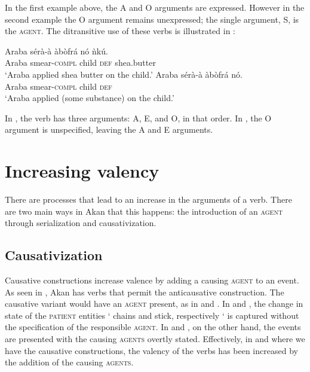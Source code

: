 \documentclass[output=paper]{langsci/langscibook}
\begin{document}
In the first example above, the A and O arguments are expressed. However in the second example the O argument remains unexpressed; the single argument, S, is the \textsc{agent}. The ditransitive use of these verbs is illustrated in :

\ea\label{ex:41.osam}
\ea\label{ex:41a.osam}
\gll  Araba  sérà-à    àbòfrá  nó  ǹkú.\\
       Araba  smear-\textsc{compl}  child  \textsc{def}  shea.butter\\
\glt `Araba applied shea butter on the child.'
\ex\label{ex:41b.osam}
\gll   Araba  sérà-à    àbòfrá  nó.\\
       Araba  smear-\textsc{compl}  child  \textsc{def}\\
\glt `Araba applied (some substance) on the child.'
\z 
\z 


In , the verb has three arguments: A, E, and O, in that order. In , the O argument is unspecified, leaving the A and E arguments.

\section{Increasing valency}\label{§5:increasing.osam}

There are processes that lead to an increase in the arguments of a verb. There are two main ways in Akan that this happens: the introduction of an \textsc{agent} through serialization and causativization.

\subsection{Causativization}\label{§5.1:causativization.osam}

Causative constructions increase valence by adding a causing \textsc{agent} to an event. As seen in , Akan has verbs that permit the anticausative construction. The causative variant would have an \textsc{agent} present, as in  and . In  and , the change in state of the \textsc{patient} entities ` chains and stick, respectively ` is captured without the specification of the responsible \textsc{agent}. In  and , on the other hand, the events are presented with the causing \textsc{agents} overtly stated. Effectively, in  and  where we have the causative constructions, the valency of the verbs has been increased by the addition of the causing \textsc{agents}.
\end{document}
